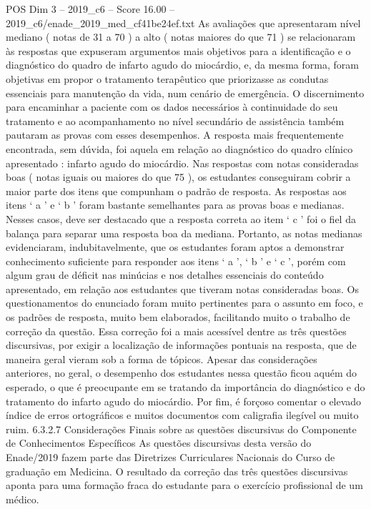 \begin{textsample}{POS Dim 3 – 2019\_c6 – Score 16.00 – 2019\_c6/enade\_2019\_med\_cf41be24ef.txt}
As avaliações que apresentaram nível mediano ( notas de 31 a 70 ) a alto ( notas maiores do que 71 ) se relacionaram às respostas que expuseram argumentos mais objetivos para a identificação e o diagnóstico do quadro de infarto agudo do miocárdio, e, da mesma forma, foram objetivas em propor o tratamento terapêutico que priorizasse as condutas essenciais para manutenção da vida, num cenário de emergência.
O discernimento para encaminhar a paciente com os dados necessários à continuidade do seu tratamento e ao acompanhamento no nível secundário de assistência também pautaram as provas com esses desempenhos.
A resposta mais frequentemente encontrada, sem dúvida, foi aquela em relação ao diagnóstico do quadro clínico apresentado : infarto agudo do miocárdio.
Nas respostas com notas consideradas boas ( notas iguais ou maiores do que 75 ), os estudantes conseguiram cobrir a maior parte dos itens que compunham o padrão de resposta.
As respostas aos itens ‘ a ’ e ‘ b ’ foram bastante semelhantes para as provas boas e medianas.
Nesses casos, deve ser destacado que a resposta correta ao item ‘ c ’ foi o fiel da balança para separar uma resposta boa da mediana.
Portanto, as notas medianas evidenciaram, indubitavelmente, que os estudantes foram aptos a demonstrar conhecimento suficiente para responder aos itens ‘ a ’, ‘ b ’ e ‘ c ’, porém com algum grau de déficit nas minúcias e nos detalhes essenciais do conteúdo apresentado, em relação aos estudantes que tiveram notas consideradas boas.
Os questionamentos do enunciado foram muito pertinentes para o assunto em foco, e os padrões de resposta, muito bem elaborados, facilitando muito o trabalho de correção da questão.
Essa correção foi a mais acessível dentre as três questões discursivas, por exigir a localização de informações pontuais na resposta, que de maneira geral vieram sob a forma de tópicos.
Apesar das considerações anteriores, no geral, o desempenho dos estudantes nessa questão ficou aquém do esperado, o que é preocupante em se tratando da importância do diagnóstico e do tratamento do infarto agudo do miocárdio.
Por fim, é forçoso comentar o elevado índice de erros ortográficos e muitos documentos com caligrafia ilegível ou muito ruim. 6.3.2.7 Considerações Finais sobre as questões discursivas do Componente de Conhecimentos Específicos As questões discursivas desta versão do Enade/2019 fazem parte das Diretrizes Curriculares Nacionais do Curso de graduação em Medicina.
O resultado da correção das três questões discursivas aponta para uma formação fraca do estudante para o exercício profissional de um médico.

\end{textsample}
